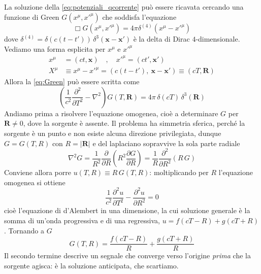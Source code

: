 La soluzione della \eqref{eq:potenziali_qcorrente} può essere ricavata cercando una funzione di Green $G(x^{\mu}, x'^{\mu})$ che soddisfa l'equazione 
\begin{equation}
\label{eq:Green}
    \Box G(x^{\mu}, x'^{\mu}) = 4\pi \delta^{(4)} (x^\mu - x'^\mu)
\end{equation}
dove $\delta^{(4)} = \delta(c(t - t'))\,\delta^3(\mathbf{x} - \mathbf{x}')$ è la delta di Dirac $4$-dimensionale. \\
Vediamo una forma esplicita per $x^\mu$ e $x'^\mu$
\begin{align}
    x^\mu &= (ct, \mathbf{x}) \quad ,\quad x'^\mu = (ct', \mathbf{x}')\\
    X^\mu &\equiv x^\mu - x'^\mu = \left(c(t-t'),\ \mathbf{x} - \mathbf{x}'\right) \equiv (cT, \mathbf{R})
\end{align}
Allora la \eqref{eq:Green} può essere scritta come
\begin{equation*}
    \left(\frac{1}{c^2} \frac{\partial^2}{\partial T^2} - \nabla^2\right)G(T, \mathbf{R}) = 4\pi\, \delta(cT)\, \delta^3(\mathbf{R})
\end{equation*}
Andiamo prima a risolvere l'equazione omogenea, cioè a determinare $G$ per $\mathbf{R} \neq 0$, dove la sorgente è assente. Il problema ha simmetria sferica, perché la sorgente è un punto e non esiste alcuna direzione privilegiata, dunque $G = G(T,R)$ con $R = |\mathbf{R}|$ e del laplaciano sopravvive la sola parte radiale
\begin{equation*}
    \nabla^2 G = \frac{1}{R^2}\frac{\partial}{\partial R}\left(R^2\frac{\partial G}{\partial R}\right) = \frac{1}{R}\frac{\partial^2}{\partial R^2}\left(R\,G\right)
\end{equation*}
Conviene allora porre $u(T,R) \equiv R\,G(T,R)$: moltiplicando per $R$ l'equazione omogenea si ottiene
\begin{equation}
    \frac{1}{c^2}\frac{\partial^2 u}{\partial T^2} - \frac{\partial^2 u}{\partial R^2} = 0
    \label{eq:dalembert_1d}
\end{equation}
cioè l'equazione di d'Alembert in una dimensione, la cui soluzione generale è la somma di un'onda progressiva e di una regressiva, $u = f(cT-R) + g(cT+R)$. Tornando a $G$
\begin{equation}
    G(T,R) = \frac{f(cT-R)}{R} + \frac{g(cT+R)}{R}
    \label{eq:G_omogenea}
\end{equation}
Il secondo termine descrive un segnale che converge verso l'origine \emph{prima} che la sorgente agisca: è la soluzione anticipata, che scartiamo.

